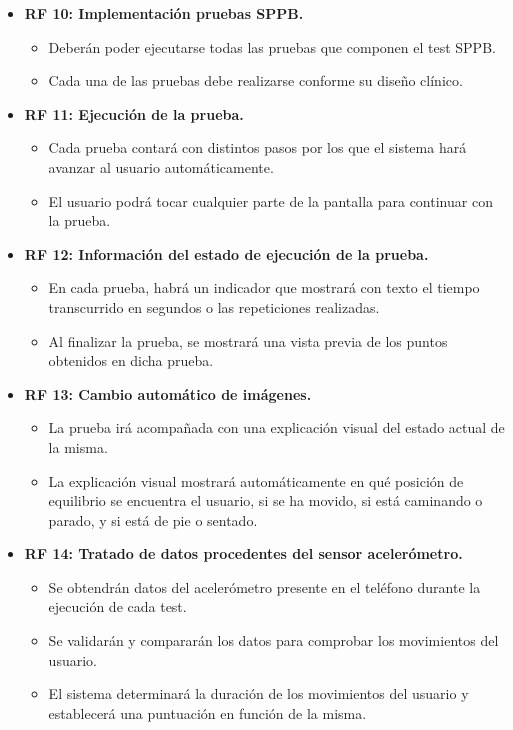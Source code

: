 \begin{itemize}
    \item \textbf{RF 10: Implementación pruebas SPPB.} 
    \begin{itemize}
        \item Deberán poder ejecutarse todas las pruebas que componen el test SPPB.
        \item Cada una de las pruebas debe realizarse conforme su diseño clínico.
    \end{itemize}
    
    \item \textbf{RF 11: Ejecución de la prueba.} 
    \begin{itemize}
        \item Cada prueba contará con distintos pasos por los que el sistema hará avanzar al usuario automáticamente.
        \item El usuario podrá tocar cualquier parte de la pantalla para continuar con la prueba.
    \end{itemize}
    
    \item \textbf{RF 12: Información del estado de ejecución de la prueba.} 
    \begin{itemize}
        \item En cada prueba, habrá un indicador que mostrará con texto el tiempo transcurrido en segundos o las repeticiones realizadas.
        \item Al finalizar la prueba, se mostrará una vista previa de los puntos obtenidos en dicha prueba.
    \end{itemize}
    
    \item \textbf{RF 13: Cambio automático de imágenes.} 
    \begin{itemize}
        \item La prueba irá acompañada con una explicación visual del estado actual de la misma.
        \item La explicación visual mostrará automáticamente en qué posición de equilibrio se encuentra el usuario, si se ha movido, si está caminando o parado, y si está de pie o sentado.
    \end{itemize}
    
    \item \textbf{RF 14: Tratado de datos procedentes del sensor acelerómetro.} 
    \begin{itemize}
        \item Se obtendrán datos del acelerómetro presente en el teléfono durante la ejecución de cada test.
        \item Se validarán y compararán los datos para comprobar los movimientos del usuario.
        \item El sistema determinará la duración de los movimientos del usuario y establecerá una puntuación en función de la misma.
    \end{itemize}
    

\end{itemize}
